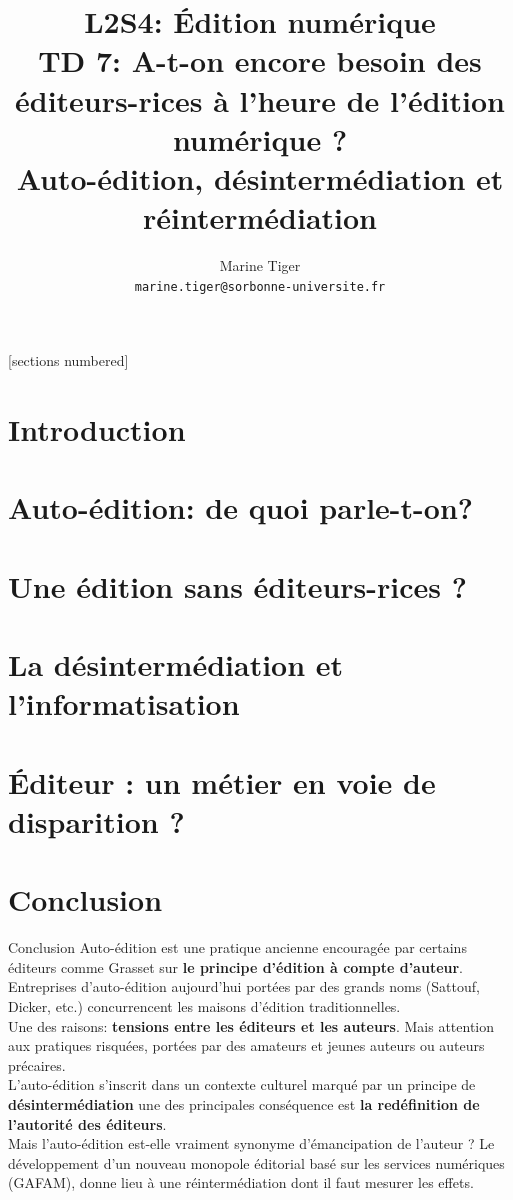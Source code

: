 \documentclass[svgnames,smaller,10pt]{beamer}
\title{L2S4: Édition numérique\\
TD 7: A-t-on encore besoin des éditeurs-rices à l'heure de l'édition numérique ?
\\
\small
Auto-édition, désintermédiation et réintermédiation
}
\date{}
\author{Marine Tiger\\   \texttt{marine.tiger@sorbonne-universite.fr}}
\institute{Littératures françaises et comparée ED19, CELLF, Sorbonne Université}
\begin{document}
\maketitle
{}[sections numbered]

\section{Introduction}


\section{Auto-édition: de quoi parle-t-on?}


\section{Une édition sans éditeurs-rices ?}


\section{La désintermédiation et l'informatisation}


\section{Éditeur : un métier en voie de disparition ?}


\section{Conclusion}
\begin{frame}{Conclusion}
  Auto-édition est une pratique ancienne encouragée par certains éditeurs comme Grasset sur \textbf{le principe d'édition à compte d'auteur}.\\
  \textrightarrow{} Entreprises d'auto-édition aujourd'hui portées par des grands noms (Sattouf, Dicker, etc.) concurrencent les maisons d'édition traditionnelles.\\
  \vspace{1em} 
  Une des raisons: \textbf{tensions entre les éditeurs et les auteurs}. Mais attention aux pratiques risquées, portées par des amateurs et jeunes auteurs ou auteurs précaires.\\ 
  \vspace{1em}
  L'auto-édition s'inscrit dans un contexte culturel marqué par un principe de \textbf{désintermédiation} \textrightarrow{} une des principales conséquence est \textbf{la redéfinition de l'autorité des éditeurs}.\\ 
  \vspace{1em}
  Mais l'auto-édition est-elle vraiment synonyme d'émancipation de l'auteur ? Le développement d'un nouveau monopole éditorial basé sur les services numériques (GAFAM), donne lieu à une réintermédiation dont il faut mesurer les effets.
\end{frame}
\end{document}
